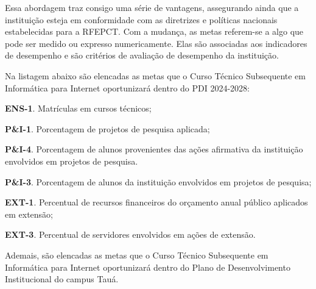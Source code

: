 \documentclass[
	12pt,				%
	openright,			%
	twoside,			%
	a4paper,			%
	chapter=TITLE,		%
	english,			%
	french,				%
	spanish,			%
	brazil,				%
	]{abntex2}
\begin{document}
Essa abordagem traz consigo uma série de vantagens, assegurando ainda que a
instituição esteja em conformidade com as diretrizes e políticas nacionais
estabelecidas para a RFEPCT. Com a mudança, as metas  referem-se a algo que pode ser medido ou expresso numericamente. Elas são
associadas aos indicadores de desempenho e são critérios de avaliação de desempenho da instituição.

Na listagem abaixo  são elencadas as metas que o  Curso Técnico Subsequente em
Informática para Internet oportunizará dentro do PDI 2024-2028:
\begin{alineas}
\item \textbf{ENS-1}. 
Matrículas em cursos
técnicos;
	\item \textbf{P\&I-1}.
Porcentagem de projetos
de pesquisa aplicada;
\item \textbf{P\&I-4}.
Porcentagem de alunos
provenientes das ações
afirmativa da instituição
envolvidos em projetos de
pesquisa. 
	\item \textbf{P\&I-3}. Porcentagem de alunos da
instituição envolvidos em
projetos de pesquisa;
\item \textbf{EXT-1}.
Percentual de recursos
financeiros do orçamento
anual público aplicados em
extensão;
	\item  \textbf{EXT-3}.
Percentual de servidores
envolvidos em ações de
extensão.
\end{alineas}

Ademais, são elencadas as metas que o Curso Técnico Subsequente em Informática para Internet oportunizará dentro do Plano de Desenvolvimento Institucional do campus Tauá.
\end{document}
